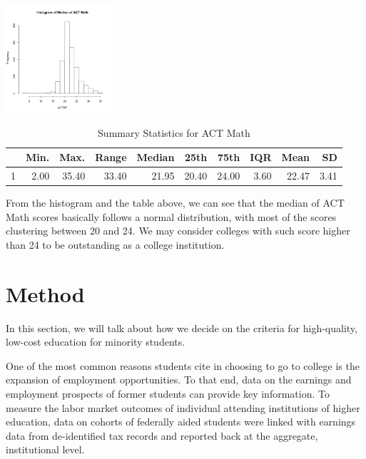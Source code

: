 \documentclass{article}\usepackage[]{graphicx}\usepackage[]{color}
\begin{document}
{\centering \includegraphics[width=150px]{../images/histogram-ACTMTMedian} 

}


\begin{table}[ht]
\centering
\begin{tabular}{rrrrrrrrrr}
  \hline
 & Min. & Max. & Range & Median & 25th & 75th & IQR & Mean & SD \\ 
  \hline
1 & 2.00 & 35.40 & 33.40 & 21.95 & 20.40 & 24.00 & 3.60 & 22.47 & 3.41 \\ 
   \hline
\end{tabular}
\caption{Summary Statistics for ACT Math} 
\end{table}


From the histogram and the table above, we can see that the median of ACT Math scores basically follows a normal distribution, with most of the scores clustering between 20 and 24. We may consider colleges with such score higher than 24 to be outstanding as a college institution.


\maketitle
\section{Method}

In this section, we will talk about how we decide on the criteria for high-quality, low-cost education for minority students.

One of the most common reasons students cite in choosing to go to college is the expansion of employment opportunities. To that end, data on the earnings and employment prospects of former students can provide key information. To measure the labor market outcomes of individual attending institutions of higher education, data on cohorts of federally aided students were linked with earnings data from de-identified tax records and reported back at the aggregate, institutional level.
\end{document}
